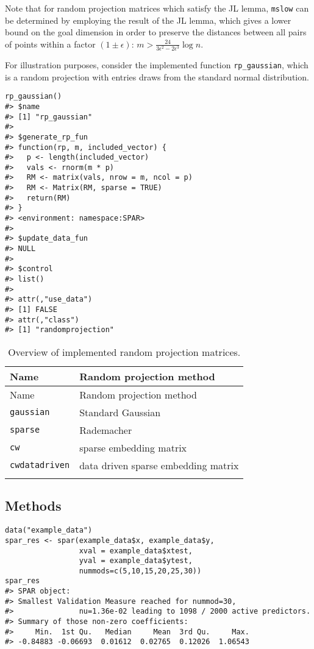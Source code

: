\documentclass[
  article]{jss}
\begin{document}
Note that for random projection matrices which satisfy the JL lemma,
\texttt{mslow} can be determined by employing the result of the JL
lemma, which gives a lower bound on the goal dimension in order to
preserve the distances between all pairs of points within a factor
\((1 \pm \epsilon)\): \(m>\frac{24}{3\epsilon^2-2\epsilon^3}\log n\).

For illustration purposes, consider the implemented function
\texttt{rp\_gaussian}, which is a random projection with entries draws
from the standard normal distribution.

\begin{verbatim}
rp_gaussian()
#> $name
#> [1] "rp_gaussian"
#> 
#> $generate_rp_fun
#> function(rp, m, included_vector) {
#>   p <- length(included_vector)
#>   vals <- rnorm(m * p)
#>   RM <- matrix(vals, nrow = m, ncol = p)
#>   RM <- Matrix(RM, sparse = TRUE)
#>   return(RM)
#> }
#> <environment: namespace:SPAR>
#> 
#> $update_data_fun
#> NULL
#> 
#> $control
#> list()
#> 
#> attr(,"use_data")
#> [1] FALSE
#> attr(,"class")
#> [1] "randomprojection"
\end{verbatim}

\begin{longtable}[]{@{}ll@{}}
\toprule\noalign{}
Name & Random projection method \\
\midrule\noalign{}
\endfirsthead
\toprule\noalign{}
Name & Random projection method \\
\midrule\noalign{}
\endhead
\bottomrule\noalign{}
\endlastfoot
\texttt{gaussian} & Standard Gaussian \\
\texttt{sparse} & Rademacher \\
\texttt{cw} & sparse embedding matrix \\
\texttt{cwdatadriven} & data driven sparse embedding matrix \\
\caption{Overview of implemented random projection
matrices.}\label{tbl-overviewrp}\tabularnewline
\end{longtable}

\subsection{Methods}\label{methods}

\begin{verbatim}
data("example_data")
spar_res <- spar(example_data$x, example_data$y,
                 xval = example_data$xtest,
                 yval = example_data$ytest,
                 nummods=c(5,10,15,20,25,30))
spar_res
#> SPAR object:
#> Smallest Validation Measure reached for nummod=30,
#>               nu=1.36e-02 leading to 1098 / 2000 active predictors.
#> Summary of those non-zero coefficients:
#>     Min.  1st Qu.   Median     Mean  3rd Qu.     Max. 
#> -0.84883 -0.06693  0.01612  0.02765  0.12026  1.06543
\end{verbatim}
\end{document}
